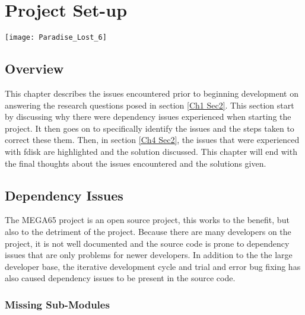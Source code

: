 
\chapter{Project Set-up} %

\label{Chapter 4} %

\texttt{[image: Paradise\_Lost\_6]}

\section{Overview}

This chapter describes the issues encountered prior to beginning development on answering the research questions posed in section \ref{Ch1 Sec2}. This section start by discussing why there were dependency issues experienced when starting the project. It then goes on to specifically identify the issues and the steps taken to correct these them. Then, in section \ref{Ch4 Sec2}, the issues that were experienced with fdisk are highlighted and the solution discussed. This chapter will end with the final thoughts about the issues encountered and the solutions given. 


\section{Dependency Issues}

\label{Ch4 Sec1}

The MEGA65 project is an open source project, this works to the benefit, but also to the detriment of the project. Because there are many developers on the project, it is not well documented and the source code is prone to dependency issues that are only problems for newer developers. In addition to the the large developer base, the iterative development cycle and trial and error bug fixing has also caused dependency issues to be present in the source code.

\subsection{Missing Sub-Modules}

